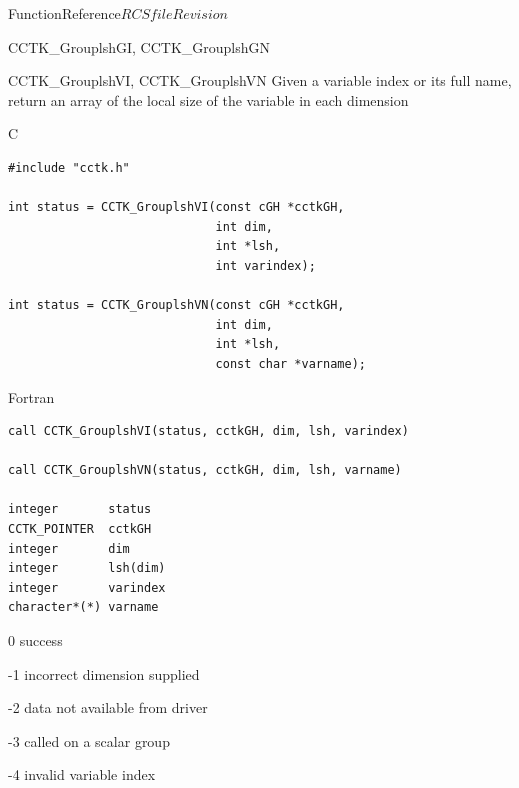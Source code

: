 \begin{cactuspart}{FunctionReference}{$RCSfile$}{$Revision$}
\begin{FunctionDescription}{CCTK\_GrouplshGI, CCTK\_GrouplshGN}
\end{FunctionDescription}


\begin{FunctionDescription}{CCTK\_GrouplshVI, CCTK\_GrouplshVN}
\label{CCTK-GrouplshVI}
\label{CCTK-GrouplshVN}
Given a variable index or its full name, return an array of the local size of the variable in each dimension

\begin{SynopsisSection}
\begin{Synopsis}{C}
\begin{verbatim}
#include "cctk.h"

int status = CCTK_GrouplshVI(const cGH *cctkGH,
                             int dim,
                             int *lsh,
                             int varindex);

int status = CCTK_GrouplshVN(const cGH *cctkGH,
                             int dim,
                             int *lsh,
                             const char *varname);
\end{verbatim}
\end{Synopsis}
\begin{Synopsis}{Fortran}
\begin{verbatim}
call CCTK_GrouplshVI(status, cctkGH, dim, lsh, varindex)

call CCTK_GrouplshVN(status, cctkGH, dim, lsh, varname)

integer       status
CCTK_POINTER  cctkGH
integer       dim
integer       lsh(dim)
integer       varindex
character*(*) varname
\end{verbatim}
\end{Synopsis}
\end{SynopsisSection}

\begin{ResultSection}
\begin{Result}{\rm 0} success \end{Result}
\begin{Result}{\rm -1} incorrect dimension supplied \end{Result}
\begin{Result}{\rm -2} data not available from driver \end{Result}
\begin{Result}{\rm -3} called on a scalar group \end{Result}
\begin{Result}{\rm -4} invalid variable index \end{Result}
\end{ResultSection}


\end{FunctionDescription}
\end{cactuspart}
